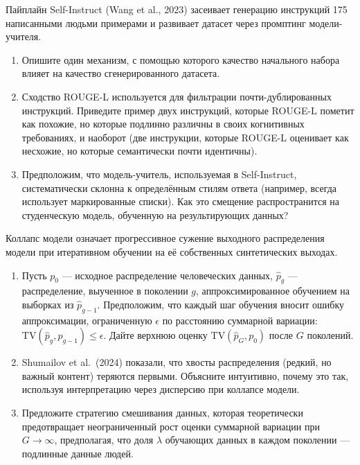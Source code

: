 \begin{exercise}
\label{ex:self-instruct}
Пайплайн Self-Instruct (Wang et al., 2023) засеивает генерацию инструкций 175 написанными людьми примерами и развивает датасет через промптинг модели-учителя.
\begin{enumerate}
  \item Опишите один механизм, с помощью которого качество начального набора влияет на качество сгенерированного датасета.
  \item Сходство ROUGE-L используется для фильтрации почти-дублированных инструкций. Приведите пример двух инструкций, которые ROUGE-L пометит как похожие, но которые подлинно различны в своих когнитивных требованиях, и наоборот (две инструкции, которые ROUGE-L оценивает как несхожие, но которые семантически почти идентичны).
  \item Предположим, что модель-учитель, используемая в Self-Instruct, систематически склонна к определённым стилям ответа (например, всегда использует маркированные списки). Как это смещение распространится на студенческую модель, обученную на результирующих данных?
\end{enumerate}
\end{exercise}

\begin{exercise}
\label{ex:model-collapse}
Коллапс модели означает прогрессивное сужение выходного распределения модели при итеративном обучении на её собственных синтетических выходах.
\begin{enumerate}
  \item Пусть $p_0$ --- исходное распределение человеческих данных, $\hat{p}_g$ --- распределение, выученное в поколении $g$, аппроксимированное обучением на выборках из $\hat{p}_{g-1}$. Предположим, что каждый шаг обучения вносит ошибку аппроксимации, ограниченную $\epsilon$ по расстоянию суммарной вариации: $\mathrm{TV}(\hat{p}_g, p_{g-1}) \leq \epsilon$. Дайте верхнюю оценку $\mathrm{TV}(\hat{p}_G, p_0)$ после $G$ поколений.
  \item Shumailov et al.\ (2024) показали, что хвосты распределения (редкий, но важный контент) теряются первыми. Объясните интуитивно, почему это так, используя интерпретацию через дисперсию при коллапсе модели.
  \item Предложите стратегию смешивания данных, которая теоретически предотвращает неограниченный рост оценки суммарной вариации при $G \to \infty$, предполагая, что доля $\lambda$ обучающих данных в каждом поколении --- подлинные данные людей.
\end{enumerate}
\end{exercise}

